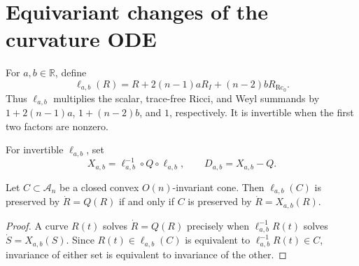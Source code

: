 \section{Equivariant changes of the curvature ODE}

\begin{definition}
  \label{def:chow-ii-ell-transformations}
  For \(a,b\in\mathbb R\), define
  \[
   \ell_{a,b}(R)=R+2(n-1)aR_I+(n-2)bR_{\operatorname{Rc}_0}.
  \]
  Thus \(\ell_{a,b}\) multiplies the scalar, trace-free Ricci, and Weyl
  summands by \(1+2(n-1)a\), \(1+(n-2)b\), and \(1\), respectively.  It is
  invertible when the first two factors are nonzero.
\end{definition}

\begin{definition}
  \label{def:chow-ii-conjugated-curvature-quadratic}
  For invertible \(\ell_{a,b}\), set
  \[
  X_{a,b}=\ell_{a,b}^{-1}\circ Q\circ\ell_{a,b},
  \qquad D_{a,b}=X_{a,b}-Q.
  \]
\end{definition}

\begin{lemma}
  \label{lem:chow-ii-linear-image-ode-cone-criterion}
  Let \(C\subset\mathcal A_n\) be a closed convex \(O(n)\)-invariant cone.
  Then \(\ell_{a,b}(C)\) is preserved by \(\dot R=Q(R)\) if and only if
  \(C\) is preserved by \(\dot R=X_{a,b}(R)\).
\end{lemma}
\begin{proof}
\sketch
  A curve \(R(t)\) solves \(\dot R=Q(R)\) precisely when
  \(\ell_{a,b}^{-1}R(t)\) solves \(\dot S=X_{a,b}(S)\).  Since
  \(R(t)\in\ell_{a,b}(C)\) is equivalent to
  \(\ell_{a,b}^{-1}R(t)\in C\), invariance of either set is equivalent to
  invariance of the other.
\end{proof}


